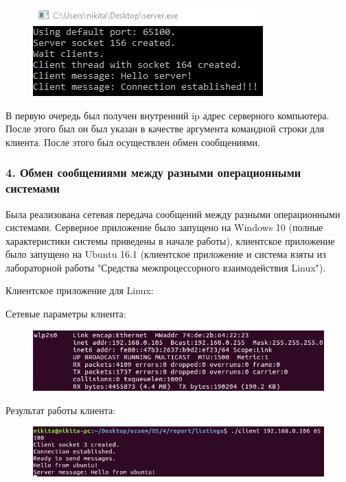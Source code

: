 \documentclass[14pt,a4paper,report]{report}
\begin{document}
\begin{figure}[h!]
	\centering
	\includegraphics[scale = 0.80]{images/p3_3_server_result.png}
	
	\caption{}
	\label{image:14}
\end{figure}

В первую очередь был получен внутренний ip адрес серверного компьютера. После этого был он был указан в качестве аргумента командной строки для клиента. После этого был осуществлен обмен сообщениями.

\subsubsection{4. Обмен сообщениями между разными операционными системами}

Была реализована сетевая передача сообщений между разными операционными системами. Серверное приложение было запущено на Windows 10 (полные характеристики системы приведены в начале работы), клиентское приложение было запущено на Ubuntu 16.1 (клиентское приложение и система взяты из лабораторной работы "Средства межпроцессорного взаимодействия Linux").

Клиентское приложение для Linux:



Сетевые параметры клиента:

\begin{figure}[h!]
	\centering
	\includegraphics[scale = 0.60]{images/p3_4_client_config.png}
	
	\caption{}
	\label{image:15}
\end{figure}

Результат работы клиента:

\begin{figure}[h!]
	\centering
	\includegraphics[scale = 0.60]{images/p3_4_client_result.png}
	
	\caption{}
	\label{image:16}
\end{figure}
\end{document}

